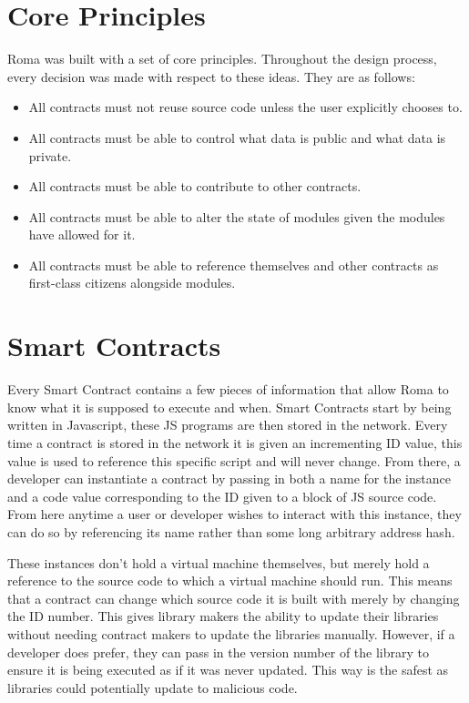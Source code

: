 \documentclass[a4paper]{article}
\begin{document}
\section{Core Principles}\label{sec:core-principles}
Roma was built with a set of core principles.
Throughout the design process, every decision was made with respect to these ideas.
They are as follows:
\begin{itemize}
  \item All contracts must not reuse source code unless the user explicitly chooses to.
  \item All contracts must be able to control what data is public and what data is private.
  \item All contracts must be able to contribute to other contracts.
  \item All contracts must be able to alter the state of modules given the modules have allowed for it.
  \item All contracts must be able to reference themselves and other contracts as first-class citizens alongside modules.
\end{itemize}


\section{Smart Contracts}\label{sec:smart-contracts}
Every Smart Contract contains a few pieces of information that allow Roma to know what it is supposed to execute and when.
Smart Contracts start by being written in Javascript, these JS programs are then stored in the network.
Every time a contract is stored in the network it is given an incrementing ID value, this value is used to reference this specific script and will never change.
From there, a developer can instantiate a contract by passing in both a name for the instance and a code value corresponding to the ID given to a block of JS source code.
From here anytime a user or developer wishes to interact with this instance, they can do so by referencing its name rather than some long arbitrary address hash.

These instances don't hold a virtual machine themselves, but merely hold a reference to the source code to which a virtual machine should run.
This means that a contract can change which source code it is built with merely by changing the ID number.
This gives library makers the ability to update their libraries without needing contract makers to update the libraries manually.
However, if a developer does prefer, they can pass in the version number of the library to ensure it is being executed as if it was never updated.
This way is the safest as libraries could potentially update to malicious code.
\end{document}
